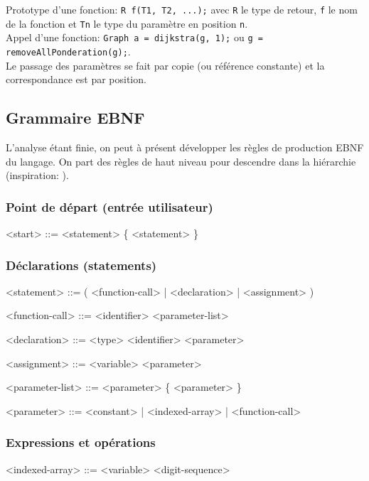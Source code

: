 \documentclass[french]{article}
\begin{document}
	Prototype d'une fonction: \texttt{R f(T1, T2, ...);} avec \texttt{R} le type de retour, \texttt{f} le nom de la fonction et \texttt{Tn} le type du paramètre en position \texttt{n}.\\
	
	Appel d'une fonction: \texttt{Graph a = dijkstra(g, 1);} ou \texttt{g = removeAllPonderation(g);}.\\
	
	Le passage des paramètres se fait par copie (ou référence constante) et la correspondance est par position.
	
	\subsection{Grammaire EBNF} %
	L'analyse étant finie, on peut à présent développer les règles de production EBNF du langage. On part des règles de haut niveau pour descendre dans la hiérarchie (inspiration: \cite{vutbr.cz}).
	
	\subsubsection{Point de départ (entrée utilisateur)}
	\begin{grammar}
		<start> ::= <statement> \{ <statement> \}
	\end{grammar}
	
	\subsubsection{Déclarations (statements)}
	\begin{grammar}
		<statement> ::= ( <function-call> | <declaration> | <assignment> ) \lit{;}
		
		<function-call> ::= <identifier> <parameter-list>
		
		<declaration> ::= <type> <identifier> \lit{=} <parameter>
		
		<assignment> ::= <variable> \lit{=} <parameter>
		
		<parameter-list> ::= \lit{(} <parameter> \{ \lit{,} <parameter> \} \lit{)}
		
		<parameter> ::= <constant> | <indexed-array> | <function-call>
	\end{grammar}
	
	\subsubsection{Expressions et opérations}
	\begin{grammar}
		<indexed-array> ::= <variable> \lit{[} <digit-sequence> \lit{]}
	\end{grammar}
	
\end{document}
